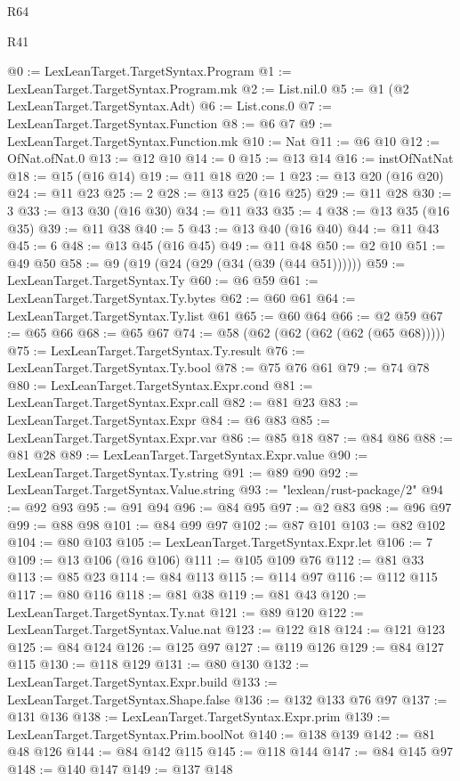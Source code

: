 \begin{lexlean}{R64}
\begin{lexlean}{R41}
\begin{coremodule}
{{{{{{{{{{{{{{{{{{{{{{{{{{{{{{{{{{{{{{{{{{{{{{{{{{{{{{{{{{{{{{{{{{{{{{{{{{{{{{{{{{{{{{{{{@0 := LexLeanTarget.TargetSyntax.Program
@1 := LexLeanTarget.TargetSyntax.Program.mk
@2 := List.nil.{0}
@5 := @1 (@2 LexLeanTarget.TargetSyntax.Adt)
@6 := List.cons.{0}
@7 := LexLeanTarget.TargetSyntax.Function
@8 := @6 @7
@9 := LexLeanTarget.TargetSyntax.Function.mk
@10 := Nat
@11 := @6 @10
@12 := OfNat.ofNat.{0}
@13 := @12 @10
@14 := 0
@15 := @13 @14
@16 := instOfNatNat
@18 := @15 (@16 @14)
@19 := @11 @18
@20 := 1
@23 := @13 @20 (@16 @20)
@24 := @11 @23
@25 := 2
@28 := @13 @25 (@16 @25)
@29 := @11 @28
@30 := 3
@33 := @13 @30 (@16 @30)
@34 := @11 @33
@35 := 4
@38 := @13 @35 (@16 @35)
@39 := @11 @38
@40 := 5
@43 := @13 @40 (@16 @40)
@44 := @11 @43
@45 := 6
@48 := @13 @45 (@16 @45)
@49 := @11 @48
@50 := @2 @10
@51 := @49 @50
@58 := @9 (@19 (@24 (@29 (@34 (@39 (@44 @51))))))
@59 := LexLeanTarget.TargetSyntax.Ty
@60 := @6 @59
@61 := LexLeanTarget.TargetSyntax.Ty.bytes
@62 := @60 @61
@64 := LexLeanTarget.TargetSyntax.Ty.list @61
@65 := @60 @64
@66 := @2 @59
@67 := @65 @66
@68 := @65 @67
@74 := @58 (@62 (@62 (@62 (@62 (@65 @68)))))
@75 := LexLeanTarget.TargetSyntax.Ty.result
@76 := LexLeanTarget.TargetSyntax.Ty.bool
@78 := @75 @76 @61
@79 := @74 @78
@80 := LexLeanTarget.TargetSyntax.Expr.cond
@81 := LexLeanTarget.TargetSyntax.Expr.call
@82 := @81 @23
@83 := LexLeanTarget.TargetSyntax.Expr
@84 := @6 @83
@85 := LexLeanTarget.TargetSyntax.Expr.var
@86 := @85 @18
@87 := @84 @86
@88 := @81 @28
@89 := LexLeanTarget.TargetSyntax.Expr.value
@90 := LexLeanTarget.TargetSyntax.Ty.string
@91 := @89 @90
@92 := LexLeanTarget.TargetSyntax.Value.string
@93 := "lexlean/rust-package/2"
@94 := @92 @93
@95 := @91 @94
@96 := @84 @95
@97 := @2 @83
@98 := @96 @97
@99 := @88 @98
@101 := @84 @99 @97
@102 := @87 @101
@103 := @82 @102
@104 := @80 @103
@105 := LexLeanTarget.TargetSyntax.Expr.let
@106 := 7
@109 := @13 @106 (@16 @106)
@111 := @105 @109 @76
@112 := @81 @33
@113 := @85 @23
@114 := @84 @113
@115 := @114 @97
@116 := @112 @115
@117 := @80 @116
@118 := @81 @38
@119 := @81 @43
@120 := LexLeanTarget.TargetSyntax.Ty.nat
@121 := @89 @120
@122 := LexLeanTarget.TargetSyntax.Value.nat
@123 := @122 @18
@124 := @121 @123
@125 := @84 @124
@126 := @125 @97
@127 := @119 @126
@129 := @84 @127 @115
@130 := @118 @129
@131 := @80 @130
@132 := LexLeanTarget.TargetSyntax.Expr.build
@133 := LexLeanTarget.TargetSyntax.Shape.false
@136 := @132 @133 @76 @97
@137 := @131 @136
@138 := LexLeanTarget.TargetSyntax.Expr.prim
@139 := LexLeanTarget.TargetSyntax.Prim.boolNot
@140 := @138 @139
@142 := @81 @48 @126
@144 := @84 @142 @115
@145 := @118 @144
@147 := @84 @145 @97
@148 := @140 @147
@149 := @137 @148
}}}}}}}}}}}}}}}}}}}}}}}}}}}}}}}}}}}}}}}}}}}}}}}}}}}}}}}}}}}}}}}}}}}}}}}}}}}}}}}}}}}}}}}}}
\end{coremodule}
\end{lexlean}
\end{lexlean}
